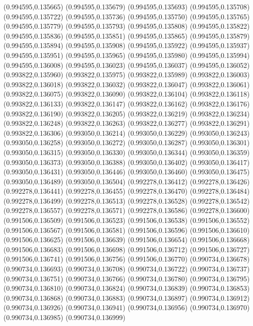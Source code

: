 (0.994595,0.135665)
(0.994595,0.135679)
(0.994595,0.135693)
(0.994595,0.135708)
(0.994595,0.135722)
(0.994595,0.135736)
(0.994595,0.135750)
(0.994595,0.135765)
(0.994595,0.135779)
(0.994595,0.135793)
(0.994595,0.135808)
(0.994595,0.135822)
(0.994595,0.135836)
(0.994595,0.135851)
(0.994595,0.135865)
(0.994595,0.135879)
(0.994595,0.135894)
(0.994595,0.135908)
(0.994595,0.135922)
(0.994595,0.135937)
(0.994595,0.135951)
(0.994595,0.135965)
(0.994595,0.135980)
(0.994595,0.135994)
(0.994595,0.136008)
(0.994595,0.136023)
(0.994595,0.136037)
(0.994595,0.136052)
(0.993822,0.135960)
(0.993822,0.135975)
(0.993822,0.135989)
(0.993822,0.136003)
(0.993822,0.136018)
(0.993822,0.136032)
(0.993822,0.136047)
(0.993822,0.136061)
(0.993822,0.136075)
(0.993822,0.136090)
(0.993822,0.136104)
(0.993822,0.136118)
(0.993822,0.136133)
(0.993822,0.136147)
(0.993822,0.136162)
(0.993822,0.136176)
(0.993822,0.136190)
(0.993822,0.136205)
(0.993822,0.136219)
(0.993822,0.136234)
(0.993822,0.136248)
(0.993822,0.136263)
(0.993822,0.136277)
(0.993822,0.136291)
(0.993822,0.136306)
(0.993050,0.136214)
(0.993050,0.136229)
(0.993050,0.136243)
(0.993050,0.136258)
(0.993050,0.136272)
(0.993050,0.136287)
(0.993050,0.136301)
(0.993050,0.136315)
(0.993050,0.136330)
(0.993050,0.136344)
(0.993050,0.136359)
(0.993050,0.136373)
(0.993050,0.136388)
(0.993050,0.136402)
(0.993050,0.136417)
(0.993050,0.136431)
(0.993050,0.136446)
(0.993050,0.136460)
(0.993050,0.136475)
(0.993050,0.136489)
(0.993050,0.136504)
(0.992278,0.136412)
(0.992278,0.136426)
(0.992278,0.136441)
(0.992278,0.136455)
(0.992278,0.136470)
(0.992278,0.136484)
(0.992278,0.136499)
(0.992278,0.136513)
(0.992278,0.136528)
(0.992278,0.136542)
(0.992278,0.136557)
(0.992278,0.136571)
(0.992278,0.136586)
(0.992278,0.136600)
(0.991506,0.136509)
(0.991506,0.136523)
(0.991506,0.136538)
(0.991506,0.136552)
(0.991506,0.136567)
(0.991506,0.136581)
(0.991506,0.136596)
(0.991506,0.136610)
(0.991506,0.136625)
(0.991506,0.136639)
(0.991506,0.136654)
(0.991506,0.136668)
(0.991506,0.136683)
(0.991506,0.136698)
(0.991506,0.136712)
(0.991506,0.136727)
(0.991506,0.136741)
(0.991506,0.136756)
(0.991506,0.136770)
(0.990734,0.136678)
(0.990734,0.136693)
(0.990734,0.136708)
(0.990734,0.136722)
(0.990734,0.136737)
(0.990734,0.136751)
(0.990734,0.136766)
(0.990734,0.136780)
(0.990734,0.136795)
(0.990734,0.136810)
(0.990734,0.136824)
(0.990734,0.136839)
(0.990734,0.136853)
(0.990734,0.136868)
(0.990734,0.136883)
(0.990734,0.136897)
(0.990734,0.136912)
(0.990734,0.136926)
(0.990734,0.136941)
(0.990734,0.136956)
(0.990734,0.136970)
(0.990734,0.136985)
(0.990734,0.136999)

